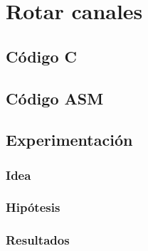 \section{Rotar canales}

\subsection{Código C}
	
\subsection{Código ASM}
	
	
	
\subsection{Experimentación}
\subsubsection{Idea}	

\subsubsection{Hipótesis}
	
	
\subsubsection{Resultados}
	